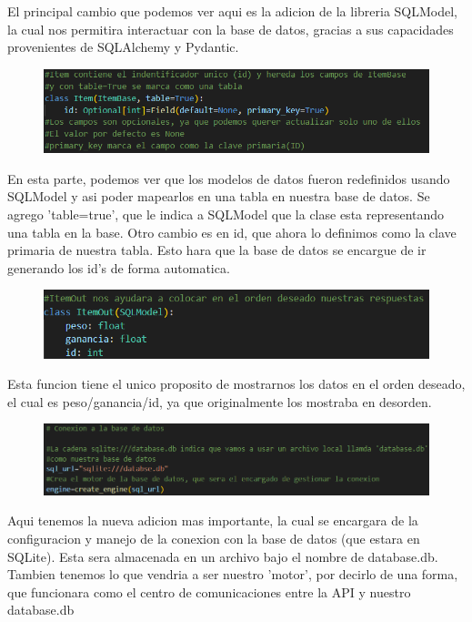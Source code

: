 \documentclass[12pt]{article}
\begin{document}
El principal cambio que podemos ver aqui es la adicion de la libreria SQLModel, la cual nos permitira interactuar con la base de datos,
gracias a sus capacidades provenientes de SQLAlchemy y Pydantic.

\begin{figure}[h!]
    \centering
    \includegraphics[width=1\textwidth]{Imagenes/Imagen WEB 3_2.png}
\end{figure}

En esta parte, podemos ver que los modelos de datos fueron redefinidos usando SQLModel y asi poder mapearlos en una tabla en nuestra base de datos.
Se agrego 'table=true', que le indica a SQLModel que la clase esta representando una tabla en la base.
Otro cambio es en id, que ahora lo definimos como la clave primaria de nuestra tabla. Esto hara que la base de datos se encargue de ir generando los id's
de forma automatica.\\

\begin{figure}[H]
    \centering
    \includegraphics[width=1\textwidth]{Imagenes/Imagen WEB 3_3.png}
\end{figure}

Esta funcion tiene el unico proposito de mostrarnos los datos en el orden deseado, el cual es peso/ganancia/id, ya que originalmente los mostraba en desorden.

\begin{figure}[h!]
    \centering
    \includegraphics[width=1\textwidth]{Imagenes/Imagen WEB 3_4.png}
\end{figure}

Aqui tenemos la nueva adicion mas importante, la cual se encargara de la configuracion y manejo de la conexion con la base de datos (que estara en SQLite).
Esta sera almacenada en un archivo bajo el nombre de database.db.
Tambien tenemos lo que vendria a ser nuestro 'motor', por decirlo de una forma, que funcionara como el centro de comunicaciones entre la API y nuestro database.db
\end{document}
